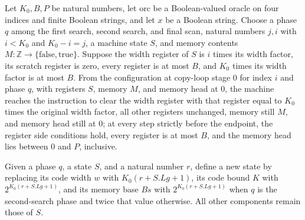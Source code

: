 \begin{theorem}
\label{Complexity.LogProg.ExpBFS.mw_run}
\leanok
{}
Let $K_0,B,P$ be natural numbers, let $\mathrm{orc}$ be a Boolean-valued oracle on four
indices and finite Boolean strings, and let $x$ be a Boolean string. Choose a phase $q$
among the first search, second search, and final scan, natural numbers $j,i$ with
$i<K_0$ and $K_0-i=j$, a machine state $S$, and memory contents
$M:\mathbb{Z}\to\{\mathrm{false},\mathrm{true}\}$. Suppose the width register of $S$ is
$i$ times its width factor, its scratch register is zero, every register is at most $B$,
and $K_0$ times its width factor is at most $B$. From the configuration at copy-loop
stage $0$ for index $i$ and phase $q$, with registers $S$, memory $M$, and memory head
at $0$, the machine reaches the instruction to clear the width register with that
register equal to $K_0$ times the original width factor, all other registers unchanged,
memory still $M$, and memory head still at $0$; at every step strictly before the
endpoint, the register side conditions hold, every register is at most $B$, and the
memory head lies between $0$ and $P$, inclusive.
\end{theorem}

\begin{definition}
\label{Complexity.LogProg.ExpBFS.wkSt}
\leanok
{}
Given a phase $q$, a state $S$, and a natural number $r$, define a new state by
replacing its code width $w$ with $K_0(r+S.Lg+1)$, its code bound $K$ with
$2^{K_0(r+S.Lg+1)}$, and its memory base $Bs$ with $2^{K_0(r+S.Lg+1)}$ when $q$ is the
second-search phase and twice that value otherwise. All other components remain those of
$S$.
\end{definition}

